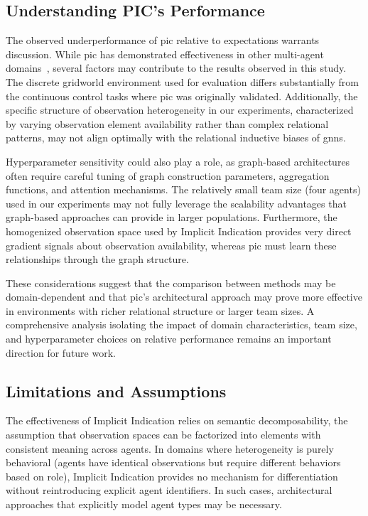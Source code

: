 \subsection{Understanding PIC's Performance}

The observed underperformance of \gls{pic} relative to expectations 
warrants discussion. While \gls{pic} has demonstrated effectiveness 
in other multi-agent domains~\cite{liu2020b}, several factors may 
contribute to the results observed in this study. 
The discrete gridworld environment used for evaluation differs substantially 
from the continuous control tasks where \gls{pic} was originally validated. 
Additionally, the specific structure of observation heterogeneity in 
our experiments, characterized by varying observation element availability 
rather than complex relational patterns, may not align optimally with the 
relational inductive biases of \glspl{gnn}.

Hyperparameter sensitivity could also play a role, as graph-based 
architectures often require careful tuning of graph construction parameters, 
aggregation functions, and attention mechanisms. The relatively small team 
size (four agents) used in our experiments may not fully leverage the 
scalability advantages that graph-based approaches can provide in larger populations. 
Furthermore, the homogenized observation space used by Implicit Indication provides 
very direct gradient signals about observation availability, whereas \gls{pic} must 
learn these relationships through the graph structure.

These considerations suggest that the comparison between methods may be 
domain-dependent and that \gls{pic}'s architectural approach may prove more 
effective in environments with richer relational structure or larger team sizes. 
A comprehensive analysis isolating the impact of domain characteristics, 
team size, and hyperparameter choices on relative performance remains an 
important direction for future work.

\subsection{Limitations and Assumptions}

The effectiveness of Implicit Indication relies on semantic decomposability, 
the assumption that observation spaces can be factorized into elements 
with consistent meaning across agents. In domains where heterogeneity is 
purely behavioral (agents have identical observations but require 
different behaviors based on role), Implicit Indication provides no 
mechanism for differentiation without reintroducing explicit agent identifiers. 
In such cases, architectural approaches that explicitly model agent types 
may be necessary.

